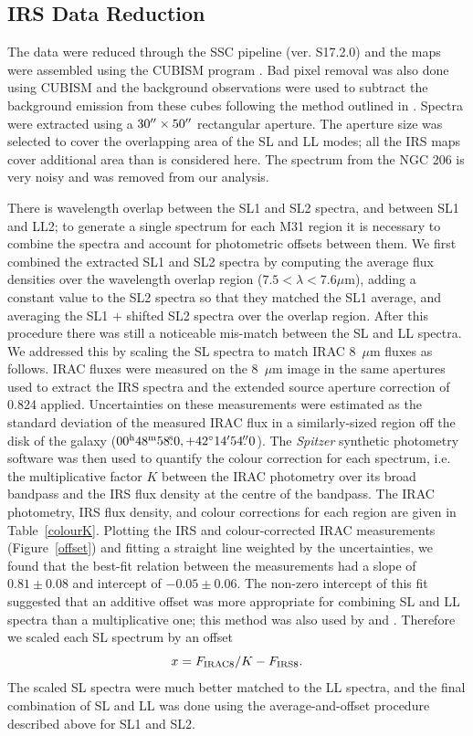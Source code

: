\subsection{IRS Data Reduction}

The data were reduced through the SSC pipeline (ver. S17.2.0) and the maps were assembled using the CUBISM program \citep{Smith:2007fk}. 
Bad pixel removal was also done using CUBISM and the background observations were used to subtract the background emission from these cubes 
following the method outlined in \citet{Gordon:2008lr}. Spectra were extracted using a $30\hbox{$^{\prime\prime}$}\times50\hbox{$^{\prime\prime}$}$   rectangular aperture. 
The aperture size was selected to cover the overlapping area of the SL and LL modes; all the IRS maps cover additional area than is considered here.
The spectrum from the NGC 206 is very noisy and was removed from our analysis. 


There is wavelength overlap between the SL1 and SL2 spectra, and between SL1 and LL2;
to generate a single spectrum for each M31 region it is necessary to combine the spectra and
account for photometric offsets between them. We first combined the extracted SL1 and SL2 
spectra by computing the average flux densities over the wavelength overlap region ($7.5 < \lambda< 7.6\mu$m),
adding a constant value to the SL2 spectra so that they matched the SL1 average,
and averaging the SL1 $+$ shifted SL2 spectra over the overlap region.
After this procedure there was still a noticeable mis-match between the SL and LL spectra. We addressed this
by scaling the SL spectra to match IRAC 8~$\mu$m fluxes as follows. IRAC fluxes were measured
on the 8~$\mu$m image \citep{Barmby2006lr} in the same apertures used to extract the IRS spectra
and the extended source  aperture correction of 0.824 applied.
Uncertainties on these measurements were estimated as the standard deviation of the measured
IRAC flux in a similarly-sized region off the disk of the galaxy ($00^{\rmn{h}}48^{\rmn{m}}58\fs0, +42\degr14\arcmin54\farcs0$). 
The {\em Spitzer} synthetic photometry software \citep{SpitzerDAC} 
was then used to quantify the colour correction for each spectrum, i.e. the
multiplicative factor $K$ between the IRAC photometry over its broad bandpass and the IRS flux
density at the centre of the bandpass. The IRAC photometry, IRS flux density, and colour corrections 
for each region are given in Table~\ref{colourK}. Plotting the IRS  and colour-corrected IRAC measurements
(Figure~\ref{offset}) and fitting a straight line weighted by the uncertainties, we found that the best-fit relation 
between the measurements had a slope of $0.81\pm0.08$  and intercept of $-0.05\pm0.06$. 
The non-zero intercept of this fit suggested that an additive offset was more appropriate for combining SL and LL
spectra than a multiplicative one; this method was also used by \citet{Gordon:2008lr} and \citet{Engelbracht_2008}.
Therefore we scaled each SL spectrum by an offset 
\begin{equation}
x = F_{\rm IRAC8}/K -   F_{\rm IRS8}.
\label{eq:offset}
\end{equation}
The scaled SL spectra were much better matched to the LL spectra, and the final combination
of SL and LL was done using the average-and-offset procedure described above for SL1 and SL2.


